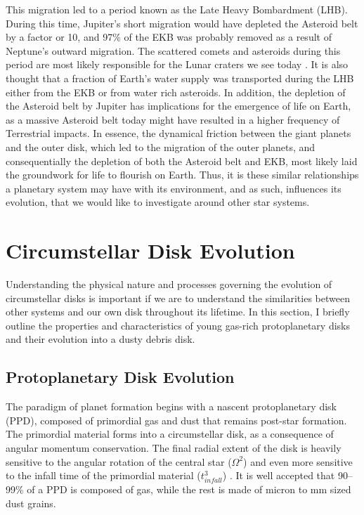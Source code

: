     This migration led to a period known as the Late Heavy Bombardment (LHB). During this time, Jupiter's short migration would have depleted the Asteroid belt by a factor or 10, and 97\% of the EKB was probably removed as a result of Neptune's outward migration. The scattered comets and asteroids during this period are most likely responsible for the Lunar craters we see today \citep{Gomes2005}. It is also thought that a fraction of Earth's water supply was transported during the LHB either from the EKB or from water rich asteroids. In addition, the depletion of the Asteroid belt by Jupiter has implications for the emergence of life on Earth, as a massive Asteroid belt today might have resulted in a higher frequency of Terrestrial impacts. In essence, the dynamical friction between the giant planets and the outer disk, which led to the migration of the outer planets, and consequentially the depletion of both the Asteroid belt and EKB, most likely laid the groundwork for life to flourish on Earth. Thus, it is these similar relationships a planetary system may have with its environment, and as such, influences its evolution, that we would like to investigate around other star systems. 

\section{Circumstellar Disk Evolution}
    
    Understanding the physical nature and processes governing the evolution of circumstellar disks is important if we are to understand the similarities between other systems and our own disk throughout its lifetime. In this section, I briefly outline the properties and characteristics of young gas-rich protoplanetary disks and their evolution into a dusty debris disk.

    \subsection{Protoplanetary Disk Evolution}
    
    The paradigm of planet formation begins with a nascent protoplanetary disk (PPD), composed of primordial gas and dust that remains post-star formation. The primordial material forms into a circumstellar disk, as a consequence of angular momentum conservation. The final radial extent of the disk is heavily sensitive to the angular rotation of the central star ($\Omega^2$) and even more sensitive to the infall time of the primordial material ($t_{infall}^3$) \citep{Terebey1984}. It is well accepted that 90--99\% of a PPD is composed of gas, while the rest is made of micron to mm sized dust grains.
    
